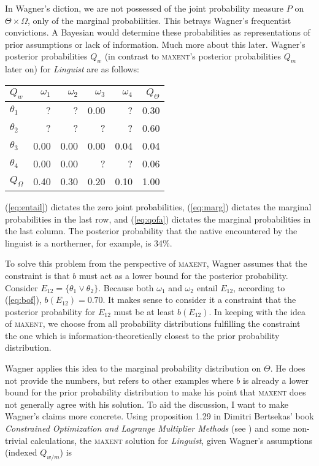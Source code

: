 \documentclass[11pt]{article}
\begin{document}
In Wagner's diction, we are not possessed of the joint probability
measure $P$ on $\Theta\times\Omega$, only of the marginal
probabilities. This betrays Wagner's frequentist convictions. A
Bayesian would determine these probabilities as representations of
prior assumptions or lack of information. Much more about this
later. Wagner's posterior probabilities $Q_{w}$ (in contrast to
\textsc{maxent}'s posterior probabilities $Q_{m}$ later on) for
\emph{Linguist} are as follows:

\medskip

\begin{tabular}{|l|r|r|r|r|r|}\hline
  $Q_{w}$ & $\omega_{1}$ & $\omega_{2}$ & $\omega_{3}$ & $\omega_{4}$ & $Q_{\Theta}$ \\ \hline
$\theta_{1}$ & ? & ? & 0.00 & ? & 0.30 \\ \hline
$\theta_{2}$ & ? & ? & ? & ? & 0.60 \\ \hline
$\theta_{3}$ & 0.00 & 0.00 & 0.00 & 0.04 & 0.04 \\ \hline
$\theta_{4}$ & 0.00 & 0.00 & ? & ? & 0.06 \\ \hline
$Q_{\Omega}$ & 0.40 & 0.30 & 0.20 & 0.10 & 1.00\\ \hline
\end{tabular}

\medskip

(\ref{eq:entail}) dictates the zero joint probabilities,
(\ref{eq:marg}) dictates the marginal probabilities in the last
row, and (\ref{eq:qofa}) dictates the marginal probabilities in
the last column. The posterior probability that the native
encountered by the linguist is a northerner, for example, is 34\%.

To solve this problem from the perspective of \textsc{maxent},
Wagner assumes that the constraint is that $b$ must act as a lower
bound for the posterior probability. Consider
$E_{12}=\{\theta_{1}\vee\theta_{2}\}$. Because both $\omega_{1}$
and $\omega_{2}$ entail $E_{12}$, according to (\ref{eq:bof}),
$b(E_{12})=0.70$. It makes sense to consider it a constraint that
the posterior probability for $E_{12}$ must be at least
$b(E_{12})$. In keeping with the idea of \textsc{maxent}, we
choose from all probability distributions fulfilling the
constraint the one which is information-theoretically closest to
the prior probability distribution. 

Wagner applies this idea to the marginal probability distribution on
$\Theta$. He does not provide the numbers, but refers to other
examples where $b$ is already a lower bound for the prior probability
distribution to make his point that \textsc{maxent} does not generally
agree with his solution. To aid the discussion, I want to make
Wagner's claims more concrete. Using proposition 1.29 in Dimitri
Bertsekas' book \emph{Constrained Optimization and Lagrange Multiplier
  Methods} (see ) and some non-trivial
calculations, the \textsc{maxent} solution for \emph{Linguist},
given Wagner's assumptions (indexed $Q_{w/m}$) is
\end{document}

